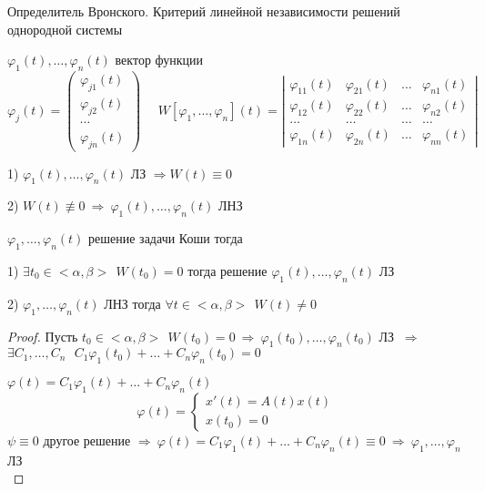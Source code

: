 \begin{title}[\Large]
  Определитель Вронского. Критерий линейной независимости решений однородной
  системы
\end{title}

\begin{define}
  $\varphi_1(t), \ldots, \varphi_n(t)$ вектор функции
  $$
  \varphi_j(t) =
  \left(
  \begin{array}{c}
    \varphi_{j1}(t) \\
    \varphi_{j2}(t) \\
    \cdots \\
    \varphi_{jn}(t)
  \end{array}
  \right) ~~~~~~
  W[\varphi_1, \ldots, \varphi_n](t) =
  \left|
  \begin{array}{cccc}
    \varphi_{11}(t) & \varphi_{21}(t) & \ldots & \varphi_{n1}(t) \\
    \varphi_{12}(t) & \varphi_{22}(t) & \ldots & \varphi_{n2}(t) \\
    \ldots & \ldots & \ldots & \ldots \\
    \varphi_{1n}(t) & \varphi_{2n}(t) & \ldots & \varphi_{nn}(t)
  \end{array}
  \right|
  $$
\end{define}

\begin{block}[Утверждения]
  1) $\varphi_1(t), \ldots, \varphi_n(t)$ ЛЗ $\Rightarrow W(t) \equiv 0$

  2) $W(t) \not\equiv 0 ~ \Rightarrow ~ \varphi_1(t), \ldots, \varphi_n(t)$ ЛНЗ
\end{block}

\begin{block}
  $\varphi_1, \ldots, \varphi_n(t)$ решение задачи Коши тогда

  1) $\exists t_0 \in <\alpha, \beta> ~~ W(t_0) = 0$ тогда решение
  $\varphi_1(t), \ldots, \varphi_n(t)$ ЛЗ

  2) $\varphi_1, \ldots, \varphi_n(t)$ ЛНЗ тогда $\forall t \in <\alpha, \beta>
  ~~ W(t) \not= 0$
\end{block}

\begin{proof}
  Пусть $t_0 \in <\alpha, \beta> ~~ W(t_0) = 0 ~ \Rightarrow ~ \varphi_1(t_0),
  \ldots, \varphi_n(t_0)$ ЛЗ $~\Rightarrow~$ $\exists C_1, \ldots, C_n ~~~
  C_1 \varphi_1(t_0) + \ldots + C_n \varphi_n (t_0) = 0$

  $\varphi(t) = C_1\varphi_1(t) + \ldots + C_n \varphi_n(t)$
  $$
  \varphi(t) =
  \left\{
  \begin{array}{l}
    x'(t) = A(t)x(t) \\
    x(t_0) = 0
  \end{array}
  \right.
  $$
  $\psi \equiv 0$ другое решение $\Rightarrow ~ \varphi(t) = C_1 \varphi_1(t) +
  \ldots + C_n \varphi_n(t) \equiv 0 ~ \Rightarrow ~ \varphi_1, \ldots,
  \varphi_n$ ЛЗ \\
\end{proof}

